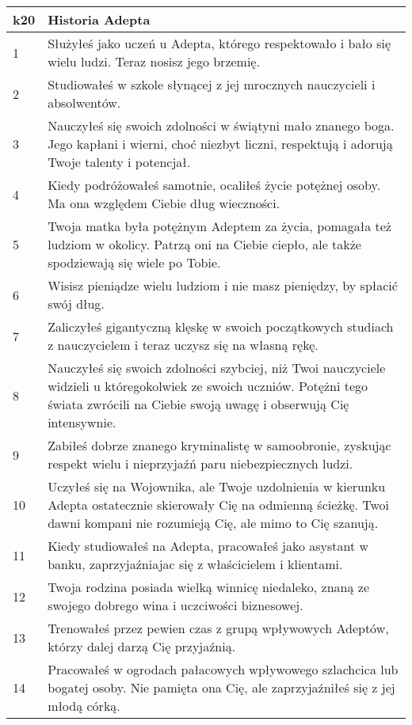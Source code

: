  \begin{table*}[t]
 \centering
 \begin{tabularx}{\textwidth}{| p{} | X |}
  \hline
  \textbf{k20} & \textbf{Historia Adepta}  \\ \hline
    1 & Służyłeś jako uczeń u Adepta, którego respektowało i bało się wielu ludzi. Teraz nosisz jego brzemię. \\ \hline
    2 & Studiowałeś w szkole słynącej z jej mrocznych nauczycieli i absolwentów. \\ \hline
    3 & Nauczyłeś się swoich zdolności w świątyni mało znanego boga. Jego kapłani i wierni, choć niezbyt liczni, respektują i adorują Twoje talenty i potencjał. \\ \hline
    4 & Kiedy podróżowałeś samotnie, ocaliłeś życie potężnej osoby. Ma ona względem Ciebie dług wieczności. \\ \hline
    5 & Twoja matka była potężnym Adeptem za życia, pomagała też ludziom w okolicy. Patrzą oni na Ciebie ciepło, ale także spodziewają się wiele po Tobie. \\ \hline
    6 & Wisisz pieniądze wielu ludziom i nie masz pieniędzy, by spłacić swój dług. \\ \hline
    7 & Zaliczyłeś gigantyczną klęskę w swoich początkowych studiach z nauczycielem i teraz uczysz się na własną rękę. \\ \hline
    8 & Nauczyłeś się swoich zdolności szybciej, niż Twoi nauczyciele widzieli u któregokolwiek ze swoich uczniów. Potężni tego świata zwrócili na Ciebie swoją uwagę i obserwują Cię intensywnie.  \\ \hline
    9 & Zabiłeś dobrze znanego kryminalistę w samoobronie, zyskując respekt wielu i nieprzyjaźń paru niebezpiecznych ludzi. \\ \hline
    10 & Uczyłeś się na Wojownika, ale Twoje uzdolnienia w kierunku Adepta ostatecznie skierowały Cię na odmienną ścieżkę. Twoi dawni kompani nie rozumieją Cię, ale mimo to Cię szanują. \\ \hline
    11 & Kiedy studiowałeś na Adepta, pracowałeś jako asystant w banku, zaprzyjaźniajac się z właścicielem i klientami. \\ \hline
    12 & Twoja rodzina posiada wielką winnicę niedaleko, znaną ze swojego dobrego wina i uczciwości biznesowej. \\ \hline
    13 & Trenowałeś przez pewien czas z grupą wpływowych Adeptów, którzy dalej darzą Cię przyjaźnią. \\ \hline
    14 & Pracowałeś w ogrodach pałacowych wpływowego szlachcica lub bogatej osoby. Nie pamięta ona Cię, ale zaprzyjaźniłeś się z jej młodą córką. \\ \hline

\end{tabularx}
\end{table*}
